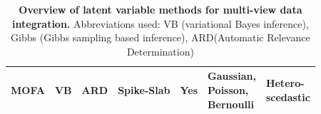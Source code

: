 \begin{table}[H]
\begin{tabular}{@{}lllllll}
		MOFA  & VB & ARD & Spike-Slab & Yes & \parbox{2cm}{Gaussian,\\Poisson,\\Bernoulli} & \parbox{2cm}{Hetero-\\scedastic} \\  \bottomrule
	\end{tabular}
	\caption{\textbf{Overview of latent variable methods for multi-view data integration.} Abbreviations used: VB (variational Bayes inference), Gibbs (Gibbs sampling based inference), ARD(Automatic Relevance Determination)}
	\label{GFAtable}
								
\end{table}

